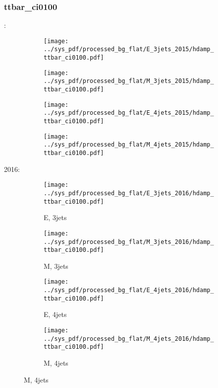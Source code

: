 \documentclass{beamer}
\begin{document}
\begin{frame}
\frametitle{ttbar_ci0100}
\fontsize{5}{1}:
\begin{figure}
\centering
\begin{subfigure}[b]{0.24\textwidth}
\texttt{[image: ../sys\_pdf/processed\_bg\_flat/E\_3jets\_2015/hdamp\_ttbar\_ci0100.pdf]}
\end{subfigure}
\begin{subfigure}[b]{0.24\textwidth}
\texttt{[image: ../sys\_pdf/processed\_bg\_flat/M\_3jets\_2015/hdamp\_ttbar\_ci0100.pdf]}
\end{subfigure}
\begin{subfigure}[b]{0.24\textwidth}
\texttt{[image: ../sys\_pdf/processed\_bg\_flat/E\_4jets\_2015/hdamp\_ttbar\_ci0100.pdf]}
\end{subfigure}
\begin{subfigure}[b]{0.24\textwidth}
\texttt{[image: ../sys\_pdf/processed\_bg\_flat/M\_4jets\_2015/hdamp\_ttbar\_ci0100.pdf]}
\end{subfigure}
\end{figure}
2016:
\begin{figure}
\centering
\begin{subfigure}[b]{0.24\textwidth}
\texttt{[image: ../sys\_pdf/processed\_bg\_flat/E\_3jets\_2016/hdamp\_ttbar\_ci0100.pdf]}
\captionsetup{font=tiny}
\caption{E, 3jets}
\end{subfigure}
\begin{subfigure}[b]{0.24\textwidth}
\texttt{[image: ../sys\_pdf/processed\_bg\_flat/M\_3jets\_2016/hdamp\_ttbar\_ci0100.pdf]}
\captionsetup{font=tiny}
\caption{M, 3jets}
\end{subfigure}
\begin{subfigure}[b]{0.24\textwidth}
\texttt{[image: ../sys\_pdf/processed\_bg\_flat/E\_4jets\_2016/hdamp\_ttbar\_ci0100.pdf]}
\captionsetup{font=tiny}
\caption{E, 4jets}
\end{subfigure}
\begin{subfigure}[b]{0.24\textwidth}
\texttt{[image: ../sys\_pdf/processed\_bg\_flat/M\_4jets\_2016/hdamp\_ttbar\_ci0100.pdf]}
\captionsetup{font=tiny}
\caption{M, 4jets}
\end{subfigure}
\end{figure}
\end{frame}
\end{document}
